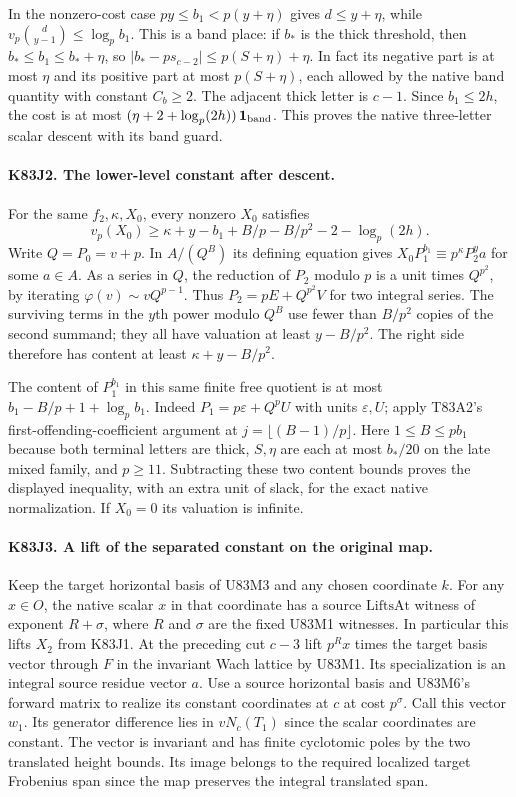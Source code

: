 In the nonzero-cost case $py\le b_1<p(y+\eta)$ gives
$d\le y+\eta$, while $v_p\binom d{y-1}\le\log_p b_1$.
This is a band place: if $b_*$ is the thick threshold, then
$b_*\le b_1\le b_*+\eta$, so
$|b_*-p s_{c-2}|\le p(S+\eta)+\eta$.
In fact its negative part is at most $\eta$ and its positive
part at most $p(S+\eta)$, each allowed by the native band
quantity with constant $C_b\ge2$. The adjacent thick letter
is $c-1$. Since $b_1\le2h$, the cost is at most
$(\eta+2+\log_p(2h))\,\mathbf1_{\rm band}$. This proves
the native three-letter scalar descent with its band guard.

\paragraph{K83J2. The lower-level constant after descent.}
For the same $f_2,\kappa,X_0$, every nonzero $X_0$ satisfies
\[
 v_p(X_0)\ge \kappa+y-b_1+B/p-B/p^2-2-\log_p(2h).
\]
Write $Q=P_0=v+p$. In $A/(Q^B)$ its defining equation gives
$X_0 P_1^{b_1}\equiv p^\kappa P_2^y a$ for some $a\in A$.
As a series in $Q$, the reduction of $P_2$ modulo $p$ is a
unit times $Q^{p^2}$, by iterating $\varphi(v)\sim vQ^{p-1}$.
Thus $P_2=pE+Q^{p^2}V$ for two integral series. The surviving
terms in the $y$th power modulo $Q^B$ use fewer than $B/p^2$
copies of the second summand; they all have valuation at least
$y-B/p^2$. The right side therefore has content at least
$\kappa+y-B/p^2$.

The content of $P_1^{b_1}$ in this same finite free quotient
is at most $b_1-B/p+1+\log_p b_1$. Indeed $P_1=p\varepsilon+
Q^p U$ with units $\varepsilon,U$; apply T83A2's
first-offending-coefficient argument at $j=\lfloor(B-1)/p\rfloor$.
Here $1\le B\le p b_1$ because both terminal letters are thick,
$S,\eta$ are each at most $b_*/20$ on the late mixed family, and
$p\ge11$. Subtracting these two content bounds proves the displayed
inequality, with an extra unit of slack, for the exact native
normalization. If $X_0=0$ its valuation is infinite.

\paragraph{K83J3. A lift of the separated constant on the original map.}
Keep the target horizontal basis of U83M3 and any chosen
coordinate $k$. For any $x\in O$, the native scalar $x$ in that
coordinate has a source $\mathrm{LiftsAt}$ witness of exponent
$R+\sigma$, where $R$ and $\sigma$ are the fixed U83M1 witnesses.
In particular this lifts $X_2$ from K83J1. At the preceding cut
$c-3$ lift $p^Rx$ times the target basis vector through $F$ in
the invariant Wach lattice by U83M1. Its specialization is an
integral source residue vector $a$. Use a source horizontal basis
and U83M6's forward matrix to realize its constant coordinates
at $c$ at cost $p^\sigma$. Call this vector $w_1$.
Its generator difference lies in $vN_c(T_1)$ since the scalar
coordinates are constant. The vector is invariant and has finite
cyclotomic poles by the two translated height bounds. Its image
belongs to the required localized target Frobenius span since the
map preserves the integral translated span.

